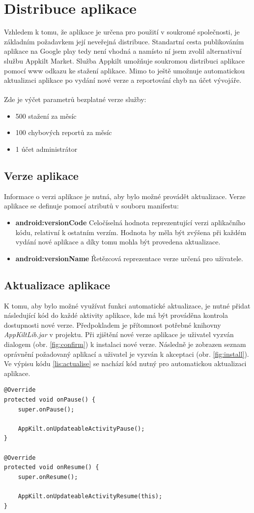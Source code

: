 \documentclass{diplomka}
\begin{document}
\section{Distribuce aplikace}
Vzhledem k tomu, že aplikace je určena pro použití v soukromé společnosti, je základním požadavkem její neveřejná distribuce. Standartní cesta publikováním aplikace na Google play tedy není vhodná a namísto ní jsem zvolil alternativní službu Appkilt Market\cite{appkilt}. Služba Appkilt umožňuje soukromou distribuci aplikace pomocí www odkazu ke stažení aplikace. Mimo to ještě umožnuje automatickou aktualizaci aplikace po vydání nové verze a reportování chyb na účet vývojáře. \\ \\Zde je výčet parametrů bezplatné verze služby:
\begin{itemize}[noitemsep,nolistsep]
\item 500 stažení za měsíc
\item 100 chybových reportů za měsíc
\item 1 účet administrátor
\end{itemize}

\subsection*{Verze aplikace}
Informace o verzi aplikace je nutná, aby bylo možné provádět aktualizace. Verze aplikace se definuje pomocí atributů v souboru manifestu:
\begin{itemize}[noitemsep,nolistsep]
\item \textbf{android:versionCode}
Celočíselná hodnota reprezentující verzi aplikačního kódu, relativní k ostatním verzím. Hodnota by měla být zvýšena při každém vydání nové aplikace a díky tomu mohla být provedena aktualizace.
\item \textbf{android:versionName}
Řetězcová reprezentace verze určená pro uživatele. 
\end{itemize}

\subsection*{Aktualizace aplikace}
K tomu, aby bylo možné využívat funkci automatické aktualizace, je nutné přidat následující kód do každé aktivity aplikace, kde má být prováděna kontrola dostupnosti nové verze. Předpokladem je přítomnost potřebné knihovny \emph{AppKiltLib.jar} v projektu. Při zjištění nové verze aplikace je uživatel vyzván dialogem (obr. \ref{fig:confirm}) k instalaci nové verze. Následně je zobrazen seznam oprávnění požadovaný aplikací a uživatel je vyzván k akceptaci (obr. \ref{fig:install}). Ve výpisu kódu \ref{lis:actualise} se nachází kód nutný pro automatickou aktualizaci aplikace.
\begin{lstlisting}[label=lis:actualise, caption=Kontrola dostupnosti aktualizace] 
@Override
protected void onPause() { 
	super.onPause();

	AppKilt.onUpdateableActivityPause();
}

@Override
protected void onResume() {
	super.onResume();
	
	AppKilt.onUpdateableActivityResume(this);
}
\end{lstlisting}
\end{document}
